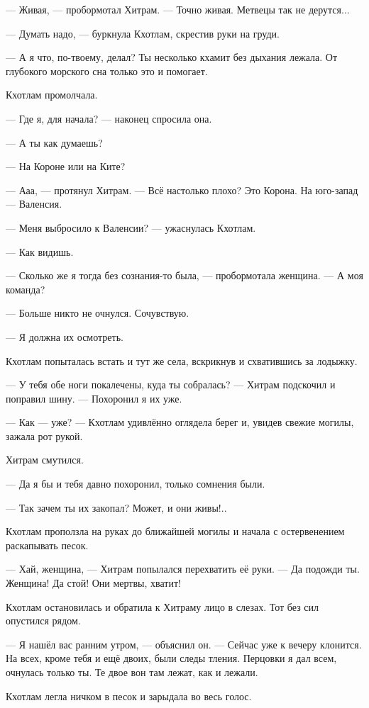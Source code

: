 --- Живая, --- пробормотал Хитрам.
--- Точно живая.
Метвецы так не дерутся...

--- Думать надо, --- буркнула Кхотлам, скрестив руки на груди.

--- А я что, по-твоему, делал?
Ты несколько кхамит без дыхания лежала.
От глубокого морского сна только это и помогает.

Кхотлам промолчала.

--- Где я, для начала? --- наконец спросила она.

--- А ты как думаешь?

--- На Короне или на Ките?

--- Ааа, --- протянул Хитрам.
--- Всё настолько плохо?
Это Корона.
На юго-запад --- Валенсия.

--- Меня выбросило к Валенсии? --- ужаснулась Кхотлам.

--- Как видишь.

--- Сколько же я тогда без сознания-то была, --- пробормотала женщина.
--- А моя команда?

--- Больше никто не очнулся.
Сочувствую.

--- Я должна их осмотреть.

Кхотлам попыталась встать и тут же села, вскрикнув и схватившись за лодыжку.

--- У тебя обе ноги покалечены, куда ты собралась? --- Хитрам подскочил и поправил шину.
--- Похоронил я их уже.

--- Как --- уже? --- Кхотлам удивлённо оглядела берег и, увидев свежие могилы, зажала рот рукой.

Хитрам смутился.

--- Да я бы и тебя давно похоронил, только сомнения были.

--- Так зачем ты их закопал?
Может, и они живы!..

Кхотлам проползла на руках до ближайшей могилы и начала с остервенением раскапывать песок.

--- Хай, женщина, --- Хитрам попылался перехватить её руки.
--- Да подожди ты.
Женщина!
Да стой!
Они мертвы, хватит!

Кхотлам остановилась и обратила к Хитраму лицо в слезах.
Тот без сил опустился рядом.

--- Я нашёл вас ранним утром, --- объяснил он.
--- Сейчас уже к вечеру клонится.
На всех, кроме тебя и ещё двоих, были следы тления.
Перцовки я дал всем, очнулась только ты.
Те двое вон там лежат, как и лежали.

Кхотлам легла ничком в песок и зарыдала во весь голос.

